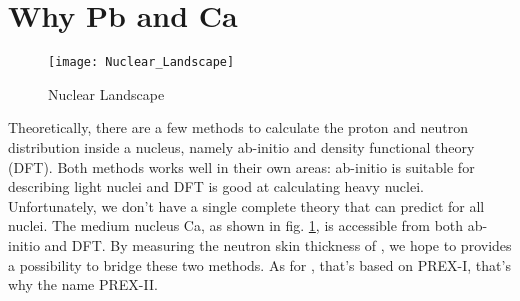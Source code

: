 \section{Why Pb and Ca}
\begin{figure}
    \centering
    \texttt{[image: Nuclear\_Landscape]}
    \caption{Nuclear Landscape}
    \label{fig:nuclear_landscape}
\end{figure}
Theoretically, there are a few methods to calculate the proton and neutron distribution
inside a nucleus, namely ab-initio and density functional theory (DFT). Both
methods works well in their own areas: ab-initio is suitable for describing  
light nuclei and DFT is good at calculating heavy nuclei. Unfortunately, we 
don't have a single complete theory that can predict for all nuclei. The medium
nucleus Ca, as shown in fig. \ref{fig:nuclear_landscape}, is accessible from both
ab-initio and DFT. By measuring the neutron skin thickness of \Ca, we hope to 
provides a possibility to bridge these two methods. As for \Pb, that's based on
PREX-I, that's why the name PREX-II.
